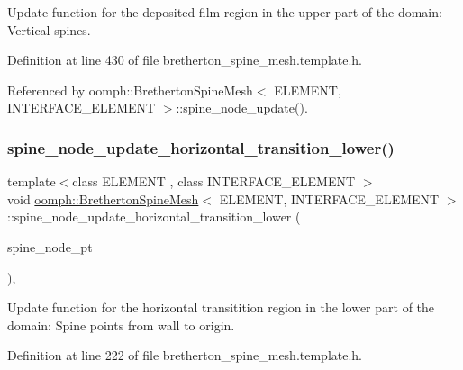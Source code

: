 Update function for the deposited film region in the upper part of the domain\+: Vertical spines. 



Definition at line 430 of file bretherton\+\_\+spine\+\_\+mesh.\+template.\+h.



Referenced by oomph\+::\+Bretherton\+Spine\+Mesh$<$ E\+L\+E\+M\+E\+N\+T, I\+N\+T\+E\+R\+F\+A\+C\+E\+\_\+\+E\+L\+E\+M\+E\+N\+T $>$\+::spine\+\_\+node\+\_\+update().

\mbox{\label{classoomph_1_1BrethertonSpineMesh_a0dc35290fc96a075d864e79528e5fec8}} 
\subsubsection{\texorpdfstring{spine\+\_\+node\+\_\+update\+\_\+horizontal\+\_\+transition\+\_\+lower()}{spine\_node\_update\_horizontal\_transition\_lower()}}
{\footnotesize\ttfamily template$<$class E\+L\+E\+M\+E\+NT , class I\+N\+T\+E\+R\+F\+A\+C\+E\+\_\+\+E\+L\+E\+M\+E\+NT $>$ \\
void \hyperlink{classoomph_1_1BrethertonSpineMesh}{oomph\+::\+Bretherton\+Spine\+Mesh}$<$ E\+L\+E\+M\+E\+NT, I\+N\+T\+E\+R\+F\+A\+C\+E\+\_\+\+E\+L\+E\+M\+E\+NT $>$\+::spine\+\_\+node\+\_\+update\+\_\+horizontal\+\_\+transition\+\_\+lower (\begin{DoxyParamCaption}\item[{Spine\+Node $\ast$}]{spine\+\_\+node\+\_\+pt }\end{DoxyParamCaption})\hspace{0.3cm}{\ttfamily [inline]}, {\ttfamily [protected]}}



Update function for the horizontal transitition region in the lower part of the domain\+: Spine points from wall to origin. 



Definition at line 222 of file bretherton\+\_\+spine\+\_\+mesh.\+template.\+h.



